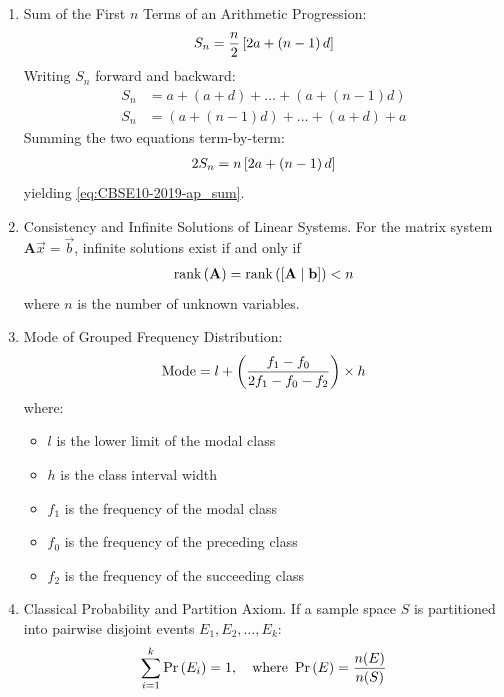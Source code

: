 \documentclass[12pt,a4paper]{article}
\begin{document}
\begin{enumerate}[label=\thesubsection.\arabic*, ref=\thesubsection.\theenumi]
	\item Sum of the First $n$ Terms of an Arithmetic Progression:
	\begin{align}
		S_n = \frac{n}{2}{}\left[2a + \left(n - 1\right)d\right] \label{eq:CBSE10-2019-ap_sum}
	\end{align}
	\solution
	Writing $S_n$ forward and backward:
	\begin{align}
		S_n &= a + (a+d) + \dots + (a + (n-1)d) \\
		S_n &= (a + (n-1)d) + \dots + (a+d) + a
	\end{align}
	Summing the two equations term-by-term:
	\begin{align}
		2S_n = n {}\left[2a + \left(n - 1\right)d\right]
	\end{align}
	yielding \eqref{eq:CBSE10-2019-ap_sum}.
	
	\item Consistency and Infinite Solutions of Linear Systems.
	For the matrix system $\mathbf{A}\vec{x} = \vec{b}$, infinite solutions exist if and only if
	\begin{align}
		\text{rank}\left(\mathbf{A}\right) = \text{rank}\left([\mathbf{A} \mid \mathbf{b}]\right) < n \label{eq:CBSE10-2019-rouche_capelli}
	\end{align}
	where $n$ is the number of unknown variables.
	
	\item Mode of Grouped Frequency Distribution:
	\begin{align}
		\text{Mode} = l + \left(\frac{f_1 - f_0}{2f_1 - f_0 - f_2}\right) \times h \label{eq:CBSE10-2019-mode}
	\end{align}
	where:
	\begin{itemize}
		\item $l$ is the lower limit of the modal class
		\item $h$ is the class interval width
		\item $f_1$ is the frequency of the modal class
		\item $f_0$ is the frequency of the preceding class
		\item $f_2$ is the frequency of the succeeding class
	\end{itemize}
	
	\item Classical Probability and Partition Axiom.
	If a sample space $S$ is partitioned into pairwise disjoint events $E_1, E_2, \dots, E_k$:
	\begin{align}
		\sum_{i=1}^k \Pr\left(E_i\right) = 1, \quad \text{where } \Pr\left(E\right) = \frac{n(E)}{n(S)} \label{eq:CBSE10-2019-prob_partition}
	\end{align}
	

\end{enumerate}
\end{document}
